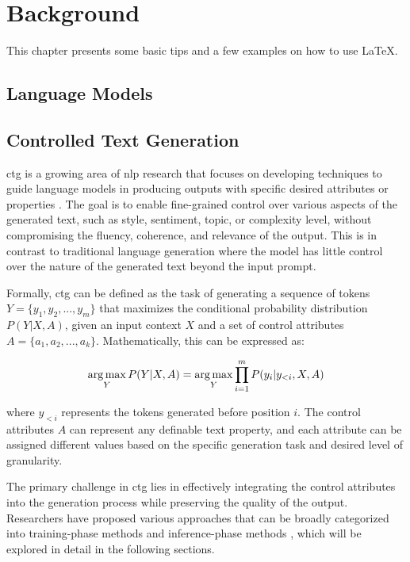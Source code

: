 \chapter{Background}
\label{c2}

This chapter presents some basic tips and a few examples on how to use \LaTeX.


\section{Language Models}
\label{c2:s:language-models}



\section{Controlled Text Generation}
\label{c2:s:controlled-text-generation}

\gls{ctg} is a growing area of \gls{nlp} research that focuses on developing techniques to guide language models in producing outputs with specific desired attributes or properties \cite{liang2024controllabletextgenerationlarge, keskar2019ctrlconditionaltransformerlanguage, dathathri2020plugplaylanguagemodels}. 
The goal is to enable fine-grained control over various aspects of the generated text, such as style, sentiment, topic, or complexity level, without compromising the fluency, coherence, and relevance of the output. 
This is in contrast to traditional language generation where the model has little control over the nature of the generated text beyond the input prompt.

Formally, \gls{ctg} can be defined as the task of generating a sequence of tokens $Y = \{y_1, y_2, ..., y_m\}$ that maximizes the conditional probability distribution $P(Y|X, A)$, given an input context $X$ and a set of control attributes $A = \{a_1, a_2, ..., a_k\}$. 
Mathematically, this can be expressed as:

\begin{equation}
    \label{eq:controlled-generation}
    \operatorname*{arg\,max}_Y P(Y | X, A) = \operatorname*{arg\,max}_Y \prod_{i = 1}^{m} P(y_i | y_{<i}, X, A)
\end{equation}

where $y_{<i}$ represents the tokens generated before position $i$. 
The control attributes $A$ can represent any definable text property, and each attribute can be assigned different values based on the specific generation task and desired level of granularity.

The primary challenge in \gls{ctg} lies in effectively integrating the control attributes into the generation process while preserving the quality of the output. 
Researchers have proposed various approaches that can be broadly categorized into training-phase methods and inference-phase methods \cite{liang2024controllabletextgenerationlarge, he-etal-2022-ctrlsum}, which will be explored in detail in the following sections.

